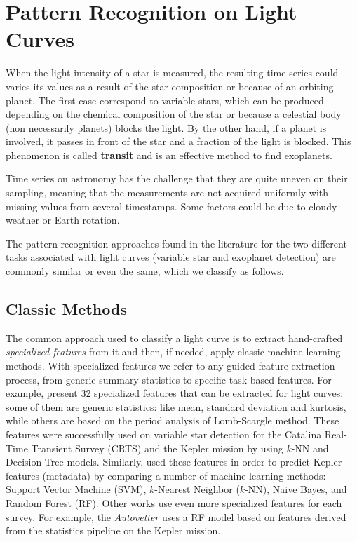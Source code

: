 \section{Pattern Recognition on Light Curves}

When the light intensity of a star is measured, the resulting time series could varies its values as a result of the star composition or because of an orbiting planet. 
The first case correspond to variable stars, which can be produced depending on the chemical composition of the star or because a celestial body (non necessarily planets) blocks the light. 
By the other hand, if a planet is involved, it passes in front of the star and a fraction of the light is blocked. This phenomenon is called \textbf{transit} and is an effective method to find exoplanets.

Time series on astronomy has the challenge that they are quite uneven on their sampling, meaning that the measurements are not acquired uniformly with missing values from several timestamps. Some factors could be due to cloudy weather or Earth rotation.

The pattern recognition approaches found in the literature for the two different tasks associated with light curves (variable star and exoplanet detection) are commonly similar or even the same, which we classify as follows.

\subsection{Classic Methods}
The common approach used to classify a light curve is to extract hand-crafted \textit{specialized features} from it and then, if needed, apply classic machine learning methods.
With specialized features we refer to any guided feature extraction process, from generic summary statistics to specific task-based features. For example,
\citet{richards2011machine} present 32 specialized features that can be extracted for light curves: some of them are generic statistics: like mean, standard deviation and kurtosis, while others are based on the period analysis of Lomb-Scargle \citep{lomb1976least} method. 
These features were successfully used on variable star detection for the Catalina Real-Time Transient Survey (CRTS) and the Kepler mission by \citet{donalek2013feature} using $k$-NN and Decision Tree models.
Similarly, \citet{hinners2017machine} used these features in order to predict Kepler features (metadata) by comparing a number of machine learning methods: Support Vector Machine (SVM), $k$-Nearest Neighbor ($k$-NN), Naive Bayes, and Random Forest (RF).
Other works use even more specialized features for each survey. For example, the \textit{Autovetter} \citep{mccauliff2015automatic} uses a RF model based on features derived from the statistics pipeline on the Kepler mission. 

